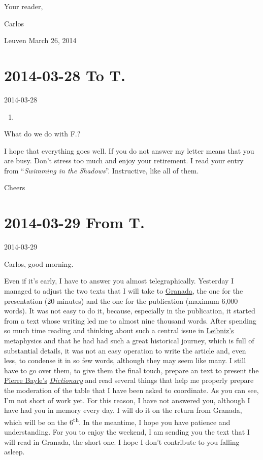 \documentclass[]{book}
\begin{document}
Your reader,

Carlos

Leuven March 26, 2014

\hypertarget{toT20140328}{%
\section*{2014-03-28 To T.}\label{toT20140328}}

2014-03-28

\begin{enumerate}
\def\labelenumi{\Alph{enumi}.}
\setcounter{enumi}{19}
\item
\end{enumerate}

What do we do with F.?

I hope that everything goes well. If you do not answer my letter means that you are busy. Don't stress too much and enjoy your retirement. I read your entry from ``\emph{Swimming in the Shadows}''. Instructive, like all of them.

Cheers

\hypertarget{FromT20140329}{%
\section*{2014-03-29 From T.}\label{FromT20140329}}

2014-03-29

Carlos, good morning.

Even if it's early, I have to answer you almost telegraphically. Yesterday I managed to adjust the two texts that I will take to \href{https://en.wikipedia.org/wiki/Granada}{Granada}, the one for the presentation (20 minutes) and the one for the publication (maximum 6,000 words). It was not easy to do it, because, especially in the publication, it started from a text whose writing led me to almost nine thousand words. After spending so much time reading and thinking about such a central issue in \href{https://en.wikipedia.org/wiki/Gottfried_Wilhelm_Leibniz}{Leibniz's} metaphysics and that he had had such a great historical journey, which is full of substantial details, it was not an easy operation to write the article and, even less, to condense it in so few words, although they may seem like many. I still have to go over them, to give them the final touch, prepare an text to present the \href{https://en.wikipedia.org/wiki/Pierre_Bayle}{Pierre Bayle's} \href{https://en.wikipedia.org/wiki/Dictionnaire_Historique_et_Critique}{\emph{Dictionary}} and read several things that help me properly prepare the moderation of the table that I have been asked to coordinate. As you can see, I'm not short of work yet. For this reason, I have not answered you, although I have had you in memory every day. I will do it on the return from Granada, which will be on the 6\textsuperscript{th}. In the meantime, I hope you have patience and understanding. For you to enjoy the weekend, I am sending you the text that I will read in Granada, the short one. I hope I don't contribute to you falling asleep.
\end{document}
